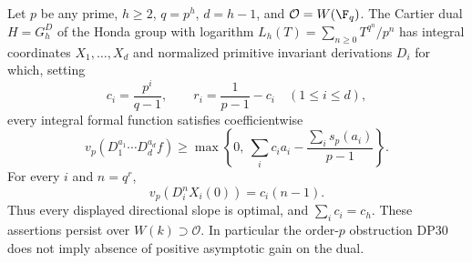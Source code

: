 \begin{theorem}\label{DP32}
Let $p$ be any prime, $h\ge2$, $q=p^h$, $d=h-1$, and $\mathcal O=W(\F_q)$. The Cartier dual $H=G_h^D$ of the Honda group with logarithm $L_h(T)=\sum_{n\ge0}T^{q^n}/p^n$ has integral coordinates $X_1,\ldots,X_d$ and normalized primitive invariant derivations $D_i$ for which, setting
\[
 c_i=\frac{p^i}{q-1},\qquad r_i=\frac1{p-1}-c_i\quad(1\le i\le d),
\]
every integral formal function satisfies coefficientwise
\begin{equation}\label{eq:dual-mixed}
 v_p(D_1^{a_1}\cdots D_d^{a_d}f)
 \ge\max\left\{0,\ \sum_i c_i a_i-\frac{\sum_i s_p(a_i)}{p-1}\right\}.
\end{equation}
For every $i$ and $n=q^r$,
\begin{equation}\label{eq:dual-sharp}
 v_p(D_i^nX_i(0))=c_i(n-1).
\end{equation}
Thus every displayed directional slope is optimal, and $\sum_i c_i=c_h$. These assertions persist over $W(k)\supset\mathcal O$. In particular the order-$p$ obstruction DP30 does not imply absence of positive asymptotic gain on the dual.
\end{theorem}
